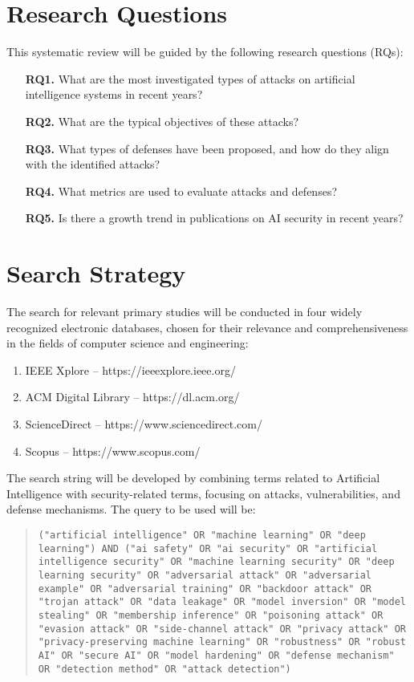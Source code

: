 \documentclass[twoside,brazilian,english]{UNISINOSmonografia}
\begin{document}
\section{Research Questions}

This systematic review will be guided by the following research questions (RQs):
\begin{itemize}
    \item[\textbf{RQ1.}] What are the most investigated types of attacks on artificial intelligence systems in recent years?
    \item[\textbf{RQ2.}] What are the typical objectives of these attacks?
    \item[\textbf{RQ3.}] What types of defenses have been proposed, and how do they align with the identified attacks?
    \item[\textbf{RQ4.}] What metrics are used to evaluate attacks and defenses?
    \item[\textbf{RQ5.}] Is there a growth trend in publications on AI security in recent years?
\end{itemize}

\section{Search Strategy}

The search for relevant primary studies will be conducted in four widely recognized electronic databases, chosen for their relevance and comprehensiveness in the fields of computer science and engineering:
\begin{enumerate}
    \item IEEE Xplore – https://ieeexplore.ieee.org/
    \item ACM Digital Library – https://dl.acm.org/
    \item ScienceDirect – https://www.sciencedirect.com/
    \item Scopus – https://www.scopus.com/
\end{enumerate}

The search string will be developed by combining terms related to Artificial Intelligence with security-related terms, focusing on attacks, vulnerabilities, and defense mechanisms. The query to be used will be:
\begin{quote}
\texttt{("artificial intelligence" OR "machine learning" OR "deep learning") AND ("ai safety" OR "ai security" OR "artificial intelligence security" OR "machine learning security" OR "deep learning security" OR "adversarial attack" OR "adversarial example" OR "adversarial training" OR "backdoor attack" OR "trojan attack" OR "data leakage" OR "model inversion" OR "model stealing" OR "membership inference" OR "poisoning attack" OR "evasion attack" OR "side-channel attack" OR "privacy attack" OR "privacy-preserving machine learning" OR "robustness" OR "robust AI" OR "secure AI" OR "model hardening" OR "defense mechanism" OR "detection method" OR "attack detection")}
\end{quote}
\end{document}
